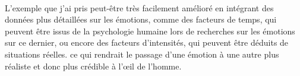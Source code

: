 ~\par
L’exemple que j’ai pris peut-être très facilement amélioré en intégrant des données plus détaillées sur les émotions, comme des facteurs de temps, qui peuvent être issus de la psychologie humaine lors de recherches sur les émotions sur ce dernier, ou encore des facteurs d'intensités, qui peuvent être déduits de situations réelles. ce qui rendrait le passage d’une émotion à une autre plus réaliste et donc plus crédible à l’œil de l’homme.
